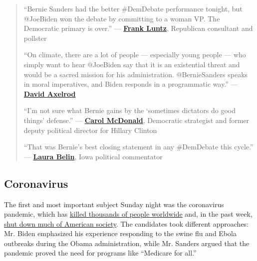 \begin{quote}
``Bernie Sanders had the better \#DemDebate performance tonight, but
@JoeBiden won the debate by committing to a woman VP. The Democratic
primary is over.'' ---
\textbf{\href{https://twitter.com/FrankLuntz/status/1239371053383573505}{Frank
Luntz}}, Republican consultant and pollster

``On climate, there are a lot of people --- especially young people ---
who simply want to hear @JoeBiden say that it is an existential threat
and would be a sacred mission for his administration. @BernieSanders
speaks in moral imperatives, and Biden responds in a programmatic way.''
---
\textbf{\href{https://twitter.com/davidaxelrod/status/1239362267302498305}{David
Axelrod}}

``I'm not sure what Bernie gains by the `sometimes dictators do good
things' defense.'' ---
\textbf{\href{https://twitter.com/DCtwiterati/status/1239366512290521089}{Carol
McDonald}}, Democratic strategist and former deputy political director
for Hillary Clinton

``That was Bernie's best closing statement in any \#DemDebate this
cycle.'' ---
\textbf{\href{https://twitter.com/LauraRBelin/status/1239370437425090561}{Laura
Belin}}, Iowa political commentator
\end{quote}

\hypertarget{coronavirus}{%
\subsection{Coronavirus}\label{coronavirus}}

The first and most important subject Sunday night was the coronavirus
pandemic, which has
\href{https://www.nytimes.com/interactive/2020/world/coronavirus-maps.html}{killed
thousands of people worldwide} and, in the past week,
\href{https://www.nytimes.com/live/2020/coronavirus-usa}{shut down much
of American society}. The candidates took different approaches: Mr.
Biden emphasized his experience responding to the swine flu and Ebola
outbreaks during the Obama administration, while Mr. Sanders argued that
the pandemic proved the need for programs like ``Medicare for all.''


